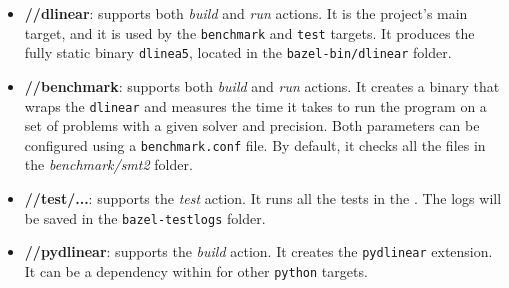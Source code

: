 \begin{itemize}
        \item \textbf{//dlinear}: supports both \textit{build} and \textit{run} actions.
              It is the project's main target, and it is used by the \texttt{benchmark} and \texttt{test} targets.
              It produces the fully static binary \texttt{dlinea5}, located in the \texttt{bazel-bin/dlinear} folder.
        \item \textbf{//benchmark}: supports both \textit{build} and \textit{run} actions.
              It creates a binary that wraps the \texttt{dlinear} and measures the time it takes to run the program on a set of problems with a given solver and precision.
              Both parameters can be configured using a \texttt{benchmark.conf} file.
              By default, it checks all the files in the \textit{benchmark/smt2} folder.
        \item \textbf{//test/...}: supports the \textit{test} action.
              It runs all the tests in the \dlinear.
              The logs will be saved in the \texttt{bazel-testlogs} folder.
        \item \textbf{//pydlinear}: supports the \textit{build} action.
              It creates the \texttt{pydlinear} extension.
              It can be a dependency within \bazel for other \texttt{python} targets.
\end{itemize}
